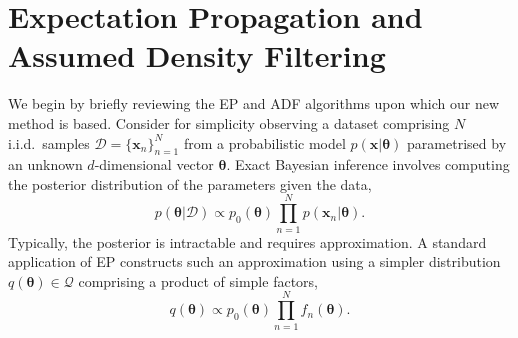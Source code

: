 

\section{Expectation Propagation and Assumed Density Filtering}
We begin by briefly reviewing the EP and ADF algorithms upon which our new method is based. Consider for simplicity observing a dataset comprising $N$ i.i.d.~samples $\mathcal{D} = \{\bm{x}_n \}_{n=1}^N$ from a probabilistic model $p(\bm{x}|\bm{\theta})$ parametrised by an unknown $d$-dimensional vector $\bm{\theta}$. Exact Bayesian inference involves computing the posterior distribution of the parameters given the data, 
\begin{equation}
p(\bm{\theta} | \mathcal{D}) \propto p_0(\bm{\theta}) \prod_{n=1}^{N} p(\bm{x}_n | \bm{\theta}).
\end{equation}
%
Typically, the posterior is intractable and requires approximation. A standard application of EP constructs such an approximation using a simpler distribution $q(\bm{\theta}) \in \mathcal{Q}$ comprising a product of simple factors,
%
%
\begin{equation}
q(\bm{\theta}) \propto p_0(\bm{\theta}) \prod_{n=1}^{N} f_n(\bm{\theta}).
\end{equation}
%
